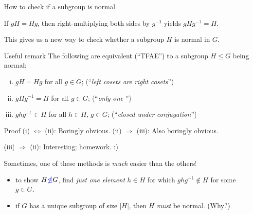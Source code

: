 \documentclass[8pt, handout]{beamer}
\newcommand{\Pause}{\pause}      %
\begin{document}
\begin{frame}{How to check if a subgroup is normal} %

  If \alert{$gH=Hg$}, then right-multiplying both sides by $g^{-1}$ yields
  $gHg^{-1}=H$.
  
  \medskip\Pause
  
  This gives us a new way to check whether a subgroup $H$ is
  \alert{normal} in $G$.
  
  \medskip\Pause

  \begin{alertblock}{Useful remark}
    The following are equivalent (``TFAE'') to a subgroup $H\leq
    G$ being normal: \smallskip\Pause
    \begin{enumerate}[(i)]
    \item $gH=Hg$ for all $g\in G$; \hfill (``\emph{left cosets are right
      cosets}'') \smallskip\Pause
    \item $gHg^{-1}=H$ for all $g\in G$; \hfill (``\emph{only one }'') \smallskip\Pause
    \item $ghg^{-1}\in H$ for all $h\in H$, $g\in G$; \hfill (``\emph{closed under
      conjugation}'')
    \end{enumerate}
  \end{alertblock}
  \begin{exampleblock}{Proof}
    (i) $\Leftrightarrow$ (ii): Boringly obvious. \Pause
    (ii) $\Rightarrow$ (iii): Also boringly obvious. 

    \smallskip\Pause
    (iii) $\Rightarrow$ (ii): Interesting; homework. :)
  \end{exampleblock}
  
  \medskip\Pause
  
  Sometimes, one of these methods is \emph{much} easier than the others!

  \begin{itemize}
    \item to show $H \Balert{\ntrianglelefteq} G$, find \emph{just one element} $h\in H$ for which $ghg^{-1}\not\in H$ for some $g\in G$.
    \item if $G$ has a unique subgroup of size $|H|$, then $H$ \emph{must} be normal. (Why?)
  \end{itemize}
  
\end{frame}

\end{document}
